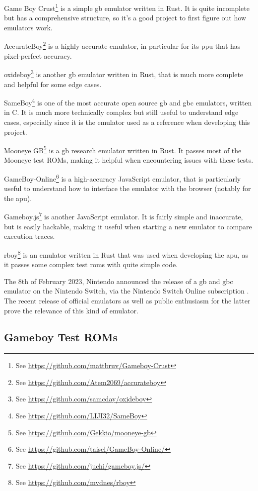 \documentclass[11pt]{informatics-report}
\newcommand{\ftnt}[1]{\footnote{See \url{#1}}}
\begin{document}
\begin{compactitem}
    \item Game Boy Crust\ftnt{https://github.com/mattbruv/Gameboy-Crust} is a simple \gls{gb} emulator written in Rust. It is quite incomplete but has a comprehensive structure, so it's a good project to first figure out how emulators work.
    \item AccurateBoy\ftnt{https://github.com/Atem2069/accurateboy} is a highly accurate emulator, in particular for its \gls{ppu} that has pixel-perfect accuracy.
    \item oxideboy\ftnt{https://github.com/samcday/oxideboy} is another \gls{gb} emulator written in Rust, that is much more complete and helpful for some edge cases.
    \item SameBoy\ftnt{https://github.com/LIJI32/SameBoy} is one of the most accurate open source \gls{gb} and \gls{gbc} emulators, written in C. It is much more technically complex but still useful to understand edge cases, especially since it is the emulator used as a reference when developing this project.
    \item Mooneye GB\ftnt{https://github.com/Gekkio/mooneye-gb} is a \gls{gb} research emulator written in Rust. It passes most of the Mooneye test ROMs, making it helpful when encountering issues with these tests.
    \item GameBoy-Online\ftnt{https://github.com/taisel/GameBoy-Online/} is a high-accuracy JavaScript emulator, that is particularly useful to understand how to interface the emulator with the browser (notably for the \gls{apu}).
    \item Gameboy.js\ftnt{https://github.com/juchi/gameboy.js/} is another JavaScript emulator. It is fairly simple and inaccurate, but is easily hackable, making it useful when starting a new emulator to compare execution traces.
    \item rboy\ftnt{https://github.com/mvdnes/rboy} is an emulator written in Rust that was used when developing the \gls{apu}, as it passes some complex test \glspl{rom} with quite simple code.
\end{compactitem}

The 8th of February 2023, Nintendo announced the release of a \glsdesc{gb} and \glsdesc{gbc} emulator on the Nintendo Switch, via the Nintendo Switch Online subscription \cite{switch_gb_emu}. The recent release of official emulators as well as public enthusiasm for the latter prove the relevance of this kind of emulator.

\subsection{Gameboy Test ROMs}
\label{sec:gb-test-roms}
\end{document}
